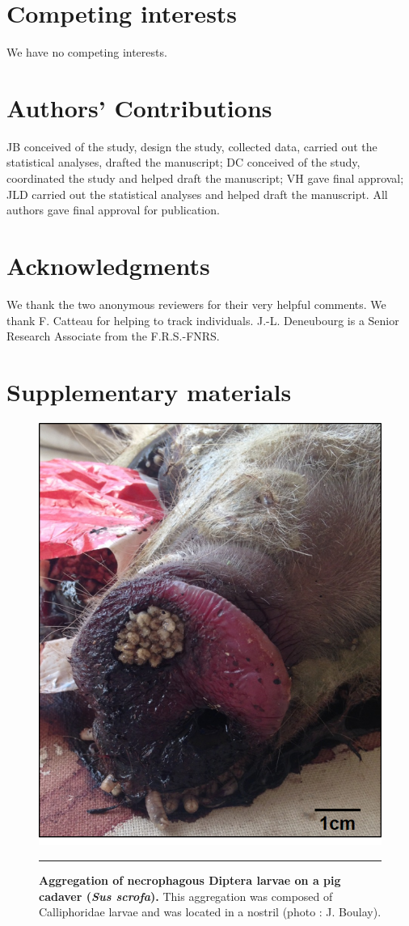 	\section{Competing interests}
We have no competing interests.

	\section{Authors’ Contributions}
JB conceived of the study, design the study, collected data, carried out the statistical analyses, drafted the manuscript; DC conceived of the study, coordinated the study and helped draft the manuscript; VH gave final approval; JLD carried out the statistical analyses and helped draft the manuscript. All authors gave final approval for publication.   

	\section{Acknowledgments}
We thank the two anonymous reviewers for their very helpful comments. We thank F. Catteau for helping to track individuals. J.-L. Deneubourg is a Senior Research Associate from the F.R.S.-FNRS. 


	\section{Supplementary materials}
    
\begin{figure}[h]
\centering
		\includegraphics[width=0.5 \textwidth]{Figures/cochon.png}
		\rule{35em}{0.5pt}
		\caption[Cochon]{\textbf{Aggregation of necrophagous Diptera larvae on a pig cadaver (\textit{Sus scrofa}).} This aggregation was composed of Calliphoridae larvae and was located in a nostril (photo : J. Boulay).}
	\label{fig:cochon}
\end{figure}    

